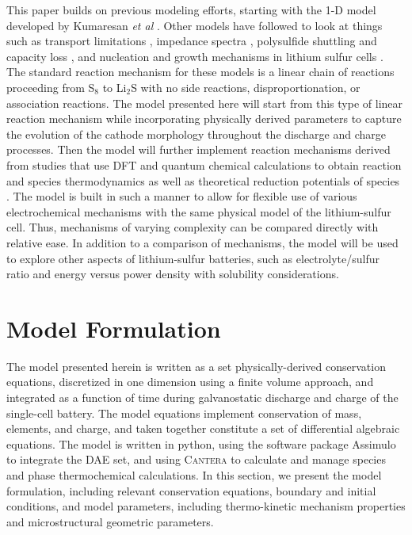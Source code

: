 \documentclass{elsarticle}
\begin{document}
This paper builds on previous modeling efforts, starting with the 1-D model developed by Kumaresan \textit{et al} \cite{Kumaresan_2008}. Other models have followed to look at things such as transport limitations \cite{ZHANG2016502}, impedance spectra \cite{FRONCZEK2013183}, polysulfide shuttling and capacity loss \cite{HOFMANN2014300}, and nucleation and growth mechanisms in lithium sulfur cells \cite{REN2016115}. The standard reaction mechanism for these models is a linear chain of reactions proceeding from S$_8$ to Li$_2$S with no side reactions, disproportionation, or association reactions. The model presented here will start from this type of linear reaction mechanism while incorporating physically derived parameters to capture the evolution of the cathode morphology throughout the discharge and charge processes. Then the model will further implement reaction mechanisms derived from studies that use DFT and quantum chemical calculations to obtain reaction and species thermodynamics as well as theoretical reduction potentials of species \cite{assary2014, kuzmina2019}. The model is built in such a manner to allow for flexible use of various electrochemical mechanisms with the same physical model of the lithium-sulfur cell. Thus, mechanisms of varying complexity can be compared directly with relative ease. In addition to a comparison of mechanisms, the model will be used to explore other aspects of lithium-sulfur batteries, such as electrolyte/sulfur ratio and energy versus power density with solubility considerations.





\section{Model Formulation}
The model presented herein is written as a set physically-derived conservation equations, discretized in one dimension using a finite volume approach, and integrated as a function of time during galvanostatic discharge and charge of the single-cell battery.  The model equations implement conservation of mass, elements, and charge, and taken together constitute a set of differential algebraic equations.  The model is written in python, using the software package Assimulo \cite{assimulo} to integrate the DAE set, and using \textsc{Cantera} \cite{cantera} to calculate and manage species and phase thermochemical calculations. In this section, we present the model formulation, including relevant conservation equations, boundary and initial conditions, and model parameters, including thermo-kinetic mechanism properties and microstructural geometric parameters.
\end{document}
